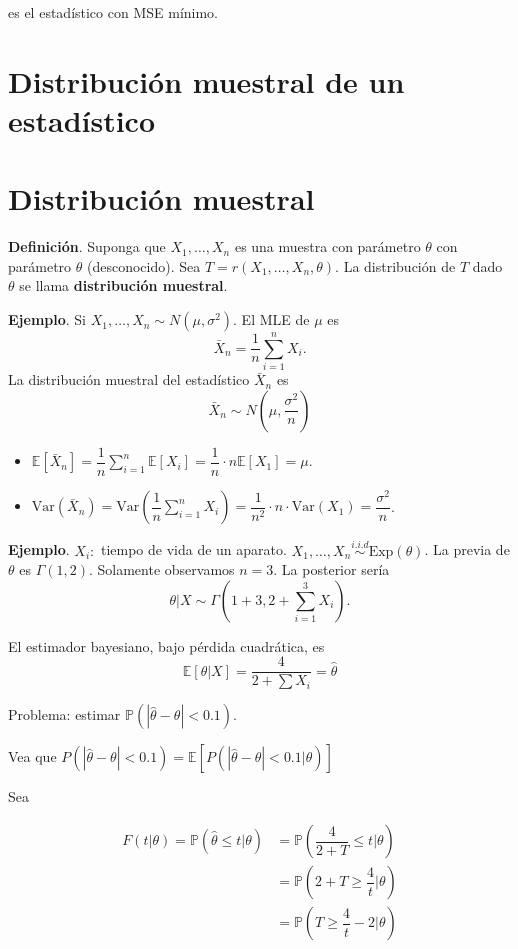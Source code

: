 \documentclass[
  12pt,
]{book}
\begin{document}
es el estadístico con MSE mínimo.

\hypertarget{distribuciuxf3n-muestral-de-un-estaduxedstico}{%
\chapter{Distribución muestral de un estadístico}\label{distribuciuxf3n-muestral-de-un-estaduxedstico}}

\hypertarget{distribuciuxf3n-muestral}{%
\chapter{Distribución muestral}\label{distribuciuxf3n-muestral}}

\textbf{Definición}. Suponga que \(X_1,\dots,X_n\) es una muestra con parámetro \(\theta\) con parámetro \(\theta\) (desconocido). Sea \(T=r(X_1,\dots,X_n,\theta)\). La distribución de \(T\) dado \(\theta\) se llama \textbf{distribución muestral}.

\textbf{Ejemplo}. Si \(X_1,\dots,X_n \sim N(\mu,\sigma^2)\). El MLE de \(\mu\) es \[\bar X_n = \dfrac 1n \sum_{i=1}^n X_i.\]
La distribución muestral del estadístico \(\bar X_n\) es
\[ \bar X_n \sim N\left(\mu, \dfrac{\sigma^2}n \right)\]

\begin{itemize}
\item
  \(\mathbb E[\bar X_n] = \dfrac 1n\displaystyle\sum_{i=1}^n\mathbb E[X_i] = \dfrac 1n\cdot n \mathbb E[X_1] = \mu\).
\item
  \(\text{Var}(\bar X_n) = \text{Var}\left(\dfrac 1n \displaystyle\sum_{i=1}^n X_i\right) = \dfrac{1}{n^2}\cdot n\cdot \text{Var}(X_1) = \dfrac{\sigma^2}n\).
\end{itemize}

\textbf{Ejemplo}. \(X_i:\) tiempo de vida de un aparato. \(X_1,\dots,X_n \stackrel{i.i.d}{\sim} \text{Exp}(\theta)\). La previa de \(\theta\) es \(\Gamma(1,2)\). Solamente observamos \(n=3\). La posterior sería
\[\theta|X \sim \Gamma(1+3,2+\sum_{i=1}^3 X_i). \]

El estimador bayesiano, bajo pérdida cuadrática, es
\[\mathbb E[\theta|X] =  \dfrac 4{2+\sum X_i} = \hat\theta\]

Problema: estimar \(\mathbb P(|\hat\theta-\theta|<0.1)\).

Vea que \(P(|\hat\theta-\theta|<0.1) = \mathbb E[P(|\hat\theta-\theta|<0.1|\theta)]\)

Sea

\begin{align*}
F(t|\theta) = \mathbb P(\hat\theta\leq t|\theta)&= \mathbb P\left( \dfrac 4{2+T}\leq t\bigg|\theta\right) \\
& = \mathbb P\left( 2+T \geq \dfrac 4t\bigg|\theta\right)\\
& = \mathbb P\left( T \geq \dfrac 4t-2\bigg|\theta\right)\\
\end{align*}
\end{document}
